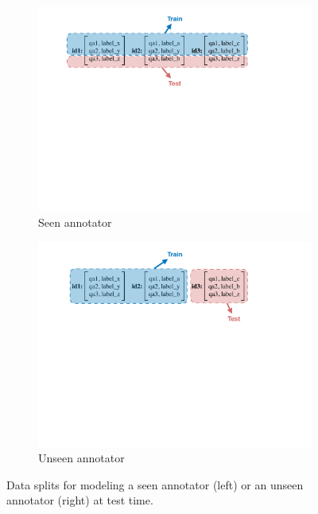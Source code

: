 \begin{figure}
\centering
\begin{subfigure}{.47\textwidth}
  \centering
  \includegraphics[width=1\linewidth]{plots/anno_known.pdf}
  \caption{Seen annotator}
  \label{fig:split_seen}
\end{subfigure}%
\hfill
\begin{subfigure}{.47\textwidth}
  \centering
  \includegraphics[width=1\linewidth]{plots/anno_unknown.pdf}
  \caption{Unseen annotator}
  \label{fig:split_unseen}
\end{subfigure}
\caption{Data splits for modeling a seen annotator (left) or an unseen annotator (right) at test time.}
\label{fig:splits}
\end{figure}

